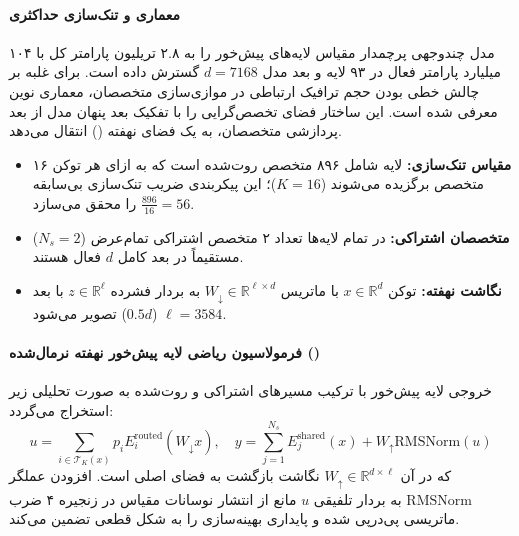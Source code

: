 \item {}

\paragraph*{معماری  و تنک‌سازی حداکثری}
مدل چندوجهی پرچمدار  \cite{kimiteam2026k3} مقیاس لایه‌های پیش‌خور را به ۲.۸ تریلیون پارامتر کل با ۱۰۴ میلیارد پارامتر فعال در ۹۳ لایه و بعد مدل $d = 7168$ گسترش داده است. برای غلبه بر چالش خطی بودن حجم ترافیک ارتباطی در موازی‌سازی متخصصان، معماری نوین  معرفی شده است. این ساختار فضای تخصص‌گرایی را با تفکیک بعد پنهان مدل از بعد پردازشی متخصصان، به یک فضای نهفته () انتقال می‌دهد.
\begin{itemize}
    \item \textbf{مقیاس تنک‌سازی:} لایه شامل ۸۹۶ متخصص روت‌شده است که به ازای هر توکن ۱۶ متخصص برگزیده می‌شوند ($K=16$)؛ این پیکربندی ضریب تنک‌سازی بی‌سابقه $\frac{896}{16} = 56$ را محقق می‌سازد.
    \item \textbf{متخصصان اشتراکی:} در تمام لایه‌ها تعداد ۲ متخصص اشتراکی تمام‌عرض ($N_s = 2$) مستقیماً در بعد کامل $d$ فعال هستند.
    \item \textbf{نگاشت نهفته:} توکن $x \in \mathbb{R}^d$ با ماتریس $W_\downarrow \in \mathbb{R}^{\ell \times d}$ به بردار فشرده $z \in \mathbb{R}^\ell$ با بعد $\ell = 3584$ ($0.5d$) تصویر می‌شود.
\end{itemize}

\paragraph*{فرمولاسیون ریاضی لایه پیش‌خور نهفته نرمال‌شده ()}
خروجی لایه پیش‌خور با ترکیب مسیرهای اشتراکی و روت‌شده به صورت تحلیلی زیر استخراج می‌گردد:
\begin{equation}
    u = \sum_{i \in \mathcal{T}_K(x)} p_i E_i^{\text{routed}}(W_\downarrow x), \quad y = \sum_{j=1}^{N_s} E_j^{\text{shared}}(x) + W_\uparrow \text{RMSNorm}(u)
\end{equation}
که در آن $W_\uparrow \in \mathbb{R}^{d \times \ell}$ نگاشت بازگشت به فضای اصلی است. افزودن عملگر $\text{RMSNorm}$ به بردار تلفیقی $u$ مانع از انتشار نوسانات مقیاس در زنجیره ۴ ضرب ماتریسی پی‌درپی شده و پایداری بهینه‌سازی را به شکل قطعی تضمین می‌کند.

